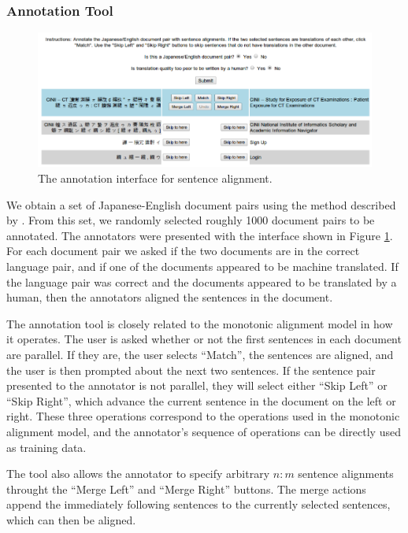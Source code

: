 \subsubsection{Annotation Tool}

\begin{figure}
\begin{center}
\includegraphics[scale=0.5]{images/google_annotate.png}
\caption{The annotation interface for sentence alignment.
}
\label{fig:google_annotate}
\end{center}
\end{figure}

We obtain a set of Japanese-English document pairs using the method described by
\citet{Uszkoreit10}. From this set, we randomly selected roughly 1000 document
pairs to be annotated. The annotators were presented with the interface shown in
Figure \ref{fig:google_annotate}. For each document pair we asked if
the two documents are in the correct language pair, and if one of the documents
appeared to be machine translated. If the language pair was correct and the
documents appeared to be translated by a human, then the annotators aligned the
sentences in the document.

The annotation tool is closely related to the monotonic alignment model in how
it operates. The user is asked whether or not the first sentences in each
document are parallel. If they are, the user selects ``Match'', the sentences
are aligned, and the user is then prompted about the next two sentences. If the
sentence pair presented to the annotator is not parallel, they will select
either ``Skip Left'' or ``Skip Right'', which advance the current sentence in
the document on the left or right. These three operations correspond to the
operations used in the monotonic alignment model, and the annotator's sequence
of operations can be directly used as training data.

The tool also allows the annotator to specify arbitrary $n:m$ sentence
alignments throught the ``Merge Left'' and ``Merge Right'' buttons. The merge
actions append the immediately following sentences to the currently selected
sentences, which can then be aligned.

